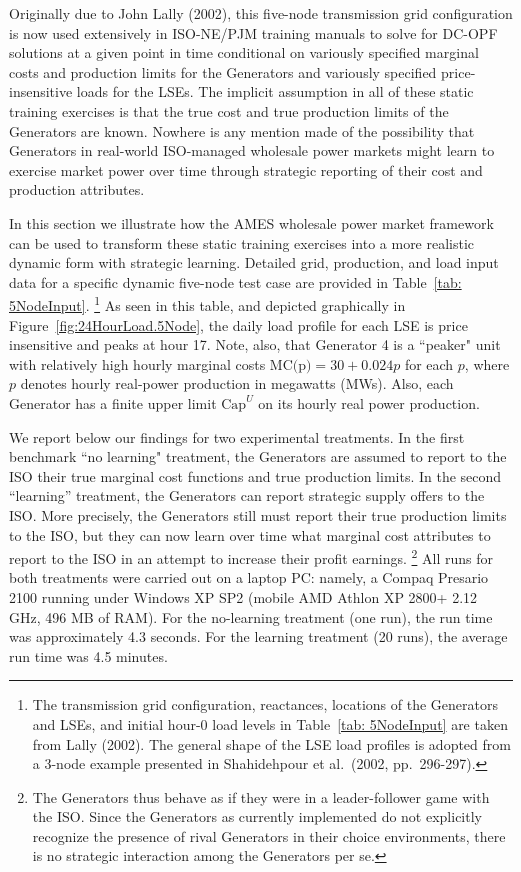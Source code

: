 \documentclass[12pt]{article}
\begin{document}
Originally due to John Lally (2002), this five-node transmission grid configuration is now used extensively in ISO-NE/PJM training manuals to solve for DC-OPF solutions at a given point in time conditional on variously specified marginal costs and production limits for the Generators and variously specified price-insensitive loads for the LSEs.  The implicit assumption in all of these static training exercises is that the true cost and true production limits of the Generators are known. Nowhere is any mention made of the possibility that Generators in real-world ISO-managed wholesale power markets might learn to exercise market power over time through strategic reporting of their cost and production attributes.

In this section we illustrate how the AMES wholesale power market framework can be used to transform these static training exercises into a more realistic dynamic form with strategic learning.  Detailed grid, production, and load input data for a specific dynamic five-node test case are provided in Table~\ref{tab: 5NodeInput}.%
       \footnote{The transmission grid configuration, reactances, locations of the Generators and LSEs, 
and initial hour-0 load levels in Table~\ref{tab: 5NodeInput} are taken from Lally (2002).  The general shape of the LSE load profiles is adopted from a 3-node example presented in Shahidehpour et al.~(2002, pp.~296-297).} 
    As seen in this table, and depicted graphically in Figure~\ref{fig:24HourLoad.5Node}, the daily load profile for each LSE is price insensitive and peaks at hour 17.  Note, also, that Generator 4 is a ``peaker" unit with relatively high hourly marginal costs $\mbox{MC(p)} = 30 + 0.024 p$ for each $p$, where $p$ denotes hourly real-power production in megawatts (MWs).  Also, each Generator has a finite upper limit $\mbox{Cap}^U$ on its hourly real power production.

We report below our findings for two experimental treatments.  In the first benchmark ``no learning" treatment, the  Generators are assumed to report to the ISO their true marginal cost functions and true production limits.  In the second ``learning'' treatment, the Generators can report strategic supply offers to the ISO.  More precisely, the Generators still must report their true production limits to the ISO, but they can now learn over time what marginal cost attributes to report to the ISO in an attempt to increase their profit earnings.%
           \footnote{The Generators thus behave as if they were in a leader-follower game with the ISO.  Since the Generators as currently implemented do not explicitly recognize the presence of rival Generators in their choice environments, there is no strategic interaction among the Generators per se.}
	All runs for both treatments were carried out on a laptop PC: namely, a Compaq Presario 2100 running under Windows XP SP2 (mobile AMD Athlon XP 2800+ 2.12 GHz, 496 MB of RAM).  For the no-learning treatment (one run), the run time was approximately 4.3 seconds.  For the learning treatment (20 runs), the average run time was 4.5 minutes.
\end{document}
